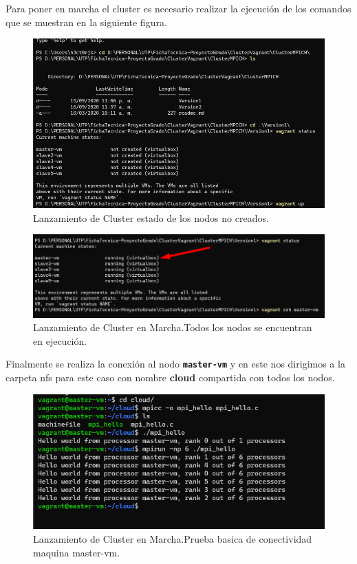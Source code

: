 \documentclass[letterpaper, 12pt, oneside]{article}
\begin{document}
    Para poner en marcha el cluster es necesario realizar la ejecución de los comandos que se muestran en la siguiente figura. 
    
    \begin{figure}[H]\centering
            \includegraphics[scale=1.4]{img/provision/version1fin.png}
            \caption{Lanzamiento de Cluster estado de los nodos no creados.}
            \label{fig:checkcluster1}
    \end{figure}
    
    \begin{figure}[H] \centering
            \includegraphics[scale=1.3]{img/provision/version1fin2.png}
            \caption{Lanzamiento de Cluster en Marcha.Todos los nodos se encuentran en ejecución.}
            \label{fig:checkcluster2}
    \end{figure}
    Finalmente se realiza la conexión al nodo \texttt{\textbf{master-vm}} y en este nos dirigimos a la carpeta nfs para este caso con nombre \textbf{cloud} compartida con todos los nodos.
    
    \begin{figure}[H] \centering
            \includegraphics[scale=1.4]{img/provision/version1fin3.png}
            \caption{Lanzamiento de Cluster en Marcha.Prueba basica de conectividad maquina master-vm.}
            \label{fig:checkcluster2}
    \end{figure}
    
\end{document}
